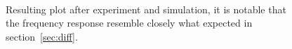 \documentclass[a4paper, twocolumn]{article}
\begin{document}
\begin{figure} [ht!]
    \centering
    \\
    \caption{Resulting plot after experiment and simulation, it is notable that the frequency response resemble closely what expected in section~\ref{sec:diff}.}
    \label{fig:expDiff}
\end{figure}
\end{document}
